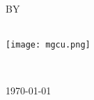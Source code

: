 \begin{titlepage}
\begin{center}
\uppercase{By}\\[0cm]

\uppercase{\textbf{\fAuthorC}}\\[1cm]




\centerline{\texttt{[image: mgcu.png]}}
\vfill
\vspace{1cm}
\normalsize{\departmentC}\\[-0.1cm] %

{\scshape\Large \UniversityC \par}\vspace{1cm} %
\vfill

{\large \today}\\[1cm] %

\vfill

\end{center}
\end{titlepage}